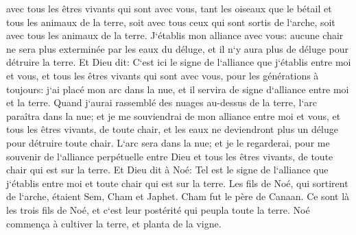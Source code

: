 \verse avec tous les êtres vivants qui sont avec vous, tant les oiseaux que le bétail et tous les animaux de la terre, soit avec tous ceux qui sont sortis de l`arche, soit avec tous les animaux de la terre. 
\verse J`établis mon alliance avec vous: aucune chair ne sera plus exterminée par les eaux du déluge, et il n`y aura plus de déluge pour détruire la terre. 
\verse Et Dieu dit: C`est ici le signe de l`alliance que j`établis entre moi et vous, et tous les êtres vivants qui sont avec vous, pour les générations à toujours: 
\verse j`ai placé mon arc dans la nue, et il servira de signe d`alliance entre moi et la terre. 
\verse Quand j`aurai rassemblé des nuages au-dessus de la terre, l`arc paraîtra dans la nue; 
\verse et je me souviendrai de mon alliance entre moi et vous, et tous les êtres vivants, de toute chair, et les eaux ne deviendront plus un déluge pour détruire toute chair. 
\verse L`arc sera dans la nue; et je le regarderai, pour me souvenir de l`alliance perpétuelle entre Dieu et tous les êtres vivants, de toute chair qui est sur la terre. 
\verse Et Dieu dit à Noé: Tel est le signe de l`alliance que j`établis entre moi et toute chair qui est sur la terre. 
\verse Les fils de Noé, qui sortirent de l`arche, étaient Sem, Cham et Japhet. Cham fut le père de Canaan. 
\verse Ce sont là les trois fils de Noé, et c`est leur postérité qui peupla toute la terre. 
\verse Noé commença à cultiver la terre, et planta de la vigne. 

